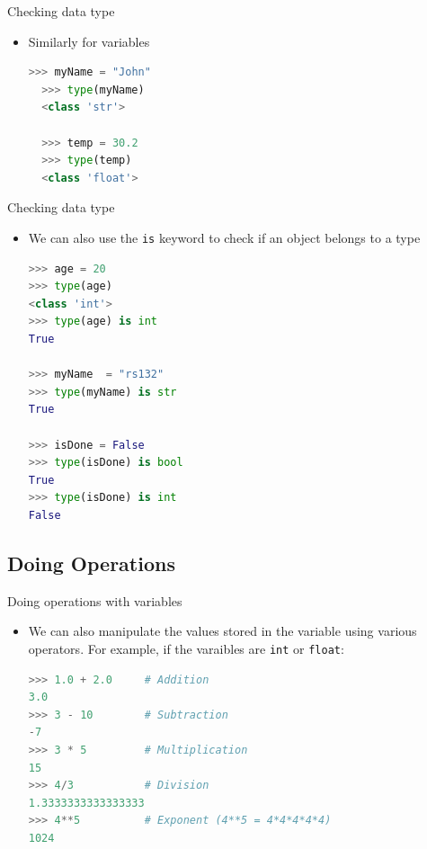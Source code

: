 \documentclass[10pt,xcolor={table,dvipsnames},t]{beamer}
\begin{document}
\begin{frame}[fragile]{Checking data type}
  \begin{itemize}
    \item Similarly for variables
\begin{lstlisting}[language=python]
  >>> myName = "John"
  >>> type(myName)
  <class 'str'>

  >>> temp = 30.2
  >>> type(temp)
  <class 'float'>
\end{lstlisting}
  \end{itemize}
\end{frame}

\begin{frame}[fragile]{Checking data type}
  \begin{itemize}
    \item We can also use the \texttt{is} keyword to check if an object belongs to a type 
\begin{lstlisting}[language=python]
>>> age = 20
>>> type(age)
<class 'int'>
>>> type(age) is int
True

>>> myName  = "rs132"
>>> type(myName) is str
True

>>> isDone = False
>>> type(isDone) is bool
True
>>> type(isDone) is int
False
\end{lstlisting}
  \end{itemize}
\end{frame}

\subsection{Doing Operations}
\begin{frame}[fragile]{Doing operations with variables}
  \begin{itemize}
    \item We can also manipulate the values stored in the variable using various operators. For example, if the varaibles are \texttt{int} or \texttt{float}:
\begin{lstlisting}[language=python]
>>> 1.0 + 2.0     # Addition
3.0
>>> 3 - 10        # Subtraction
-7
>>> 3 * 5         # Multiplication
15
>>> 4/3           # Division
1.3333333333333333
>>> 4**5          # Exponent (4**5 = 4*4*4*4*4)
1024
\end{lstlisting}
  \end{itemize}
\end{frame}
\end{document}
